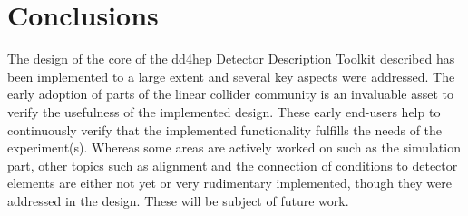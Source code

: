\documentclass[a4paper]{jpconf}
\begin{document}
\section{Conclusions}
\noindent
The design of the core of the dd4hep Detector Description Toolkit described 
has been implemented to a large extent and several key aspects were addressed.
The early adoption of parts of the linear collider community is an invaluable
asset to verify the usefulness of the implemented design. These early 
end-users help to continuously verify that the implemented functionality
fulfills the needs of the experiment(s). 
Whereas some areas are actively worked on such as the simulation part,
other topics such as alignment and the connection of conditions to 
detector elements are either not yet or very rudimentary implemented,
though they were addressed in the design.
These will be subject of future work.
\end{document}

